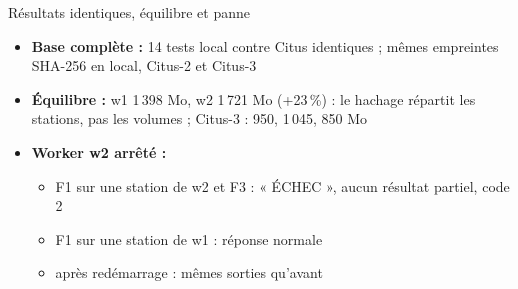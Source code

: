 \documentclass[aspectratio=169]{pres}
\begin{document}

\begin{frame}{Résultats identiques, équilibre et panne}
  \small
  \begin{itemize}
    \item \textbf{Base complète :} 14 tests local contre Citus identiques ; mêmes empreintes SHA-256 en local, Citus-2 et Citus-3
    \item \textbf{Équilibre :} w1 1\,398 Mo, w2 1\,721 Mo (+23\,\%) : le hachage répartit les stations, pas les volumes ; Citus-3 : 950, 1\,045, 850 Mo
    \item \textbf{Worker w2 arrêté :}
      \begin{itemize}
        \item F1 sur une station de w2 et F3 : « ÉCHEC », aucun résultat partiel, code 2
        \item F1 sur une station de w1 : réponse normale
        \item après redémarrage : mêmes sorties qu'avant
      \end{itemize}
  \end{itemize}
\end{frame}
\end{document}
